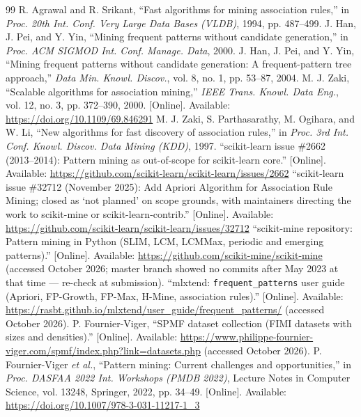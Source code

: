 \documentclass[journal,a4paper]{IEEEtran}
\begin{document}
\begin{thebibliography}{99}\footnotesize
{} R. Agrawal and R. Srikant, ``Fast algorithms for mining association rules,'' in \emph{Proc. 20th Int. Conf. Very Large Data Bases (VLDB)}, 1994, pp. 487--499.
 J. Han, J. Pei, and Y. Yin, ``Mining frequent patterns without candidate generation,'' in \emph{Proc. ACM SIGMOD Int. Conf. Manage. Data}, 2000.
 J. Han, J. Pei, and Y. Yin, ``Mining frequent patterns without candidate generation: A frequent-pattern tree approach,'' \emph{Data Min. Knowl. Discov.}, vol. 8, no. 1, pp. 53--87, 2004.
 M. J. Zaki, ``Scalable algorithms for association mining,'' \emph{IEEE Trans. Knowl. Data Eng.}, vol. 12, no. 3, pp. 372--390, 2000. [Online]. Available: \url{https://doi.org/10.1109/69.846291}
 M. J. Zaki, S. Parthasarathy, M. Ogihara, and W. Li, ``New algorithms for fast discovery of association rules,'' in \emph{Proc. 3rd Int. Conf. Knowl. Discov. Data Mining (KDD)}, 1997.
 ``scikit-learn issue \#2662 (2013--2014): Pattern mining as out-of-scope for scikit-learn core.'' [Online]. Available: \url{https://github.com/scikit-learn/scikit-learn/issues/2662}
 ``scikit-learn issue \#32712 (November 2025): Add Apriori Algorithm for Association Rule Mining; closed as `not planned' on scope grounds, with maintainers directing the work to scikit-mine or scikit-learn-contrib.'' [Online]. Available: \url{https://github.com/scikit-learn/scikit-learn/issues/32712}
 ``scikit-mine repository: Pattern mining in Python (SLIM, LCM, LCMMax, periodic and emerging patterns).'' [Online]. Available: \url{https://github.com/scikit-mine/scikit-mine} (accessed October 2026; master branch showed no commits after May 2023 at that time --- re-check at submission).
 ``mlxtend: \texttt{frequent\_patterns} user guide (Apriori, FP-Growth, FP-Max, H-Mine, association rules).'' [Online]. Available: \url{https://rasbt.github.io/mlxtend/user_guide/frequent_patterns/} (accessed October 2026).
 P. Fournier-Viger, ``SPMF dataset collection (FIMI datasets with sizes and densities).'' [Online]. Available: \url{https://www.philippe-fournier-viger.com/spmf/index.php?link=datasets.php} (accessed October 2026).
 P. Fournier-Viger \emph{et al.}, ``Pattern mining: Current challenges and opportunities,'' in \emph{Proc. DASFAA 2022 Int. Workshops (PMDB 2022)}, Lecture Notes in Computer Science, vol. 13248, Springer, 2022, pp. 34--49. [Online]. Available: \url{https://doi.org/10.1007/978-3-031-11217-1_3}

\end{thebibliography}
\end{document}
